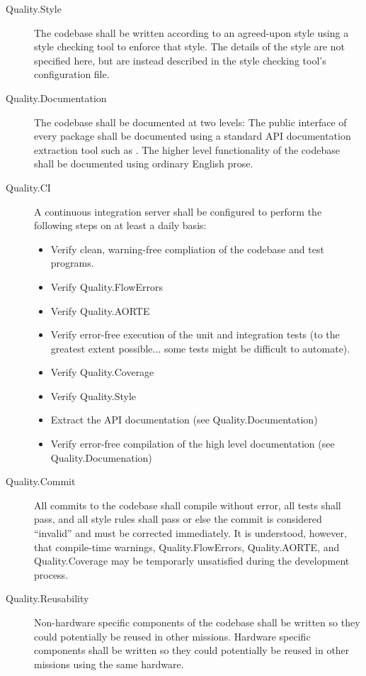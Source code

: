 \begin{description}
\item[Quality.Style] The codebase shall be written according to an
  agreed-upon style using a style checking tool to enforce that
  style. The details of the style are not specified here, but are
  instead described in the style checking tool's configuration file.

\item[Quality.Documentation] The codebase shall be documented at two
  levels: The public interface of every package shall be documented
  using a standard API documentation extraction tool such as
  . The higher level functionality of the codebase
  shall be documented using ordinary English prose.
  
\item[Quality.CI] A continuous integration server shall be configured
  to perform the following steps on at least a daily basis:
  \begin{itemize}
  \item Verify clean, warning-free compliation of the codebase and
    test programs.
  \item Verify Quality.FlowErrors
  \item Verify Quality.AORTE
  \item Verify error-free execution of the unit and integration tests
    (to the greatest extent possible... some tests might be difficult
    to automate).
  \item Verify Quality.Coverage
  \item Verify Quality.Style
  \item Extract the API documentation (see Quality.Documentation)
  \item Verify error-free compilation of the high level documentation
    (see Quality.Documenation)
  \end{itemize}

\item[Quality.Commit] All commits to the codebase shall compile
  without error, all tests shall pass, and all style rules shall pass
  or else the commit is considered ``invalid'' and must be corrected
  immediately. It is understood, however, that compile-time warnings,
  Quality.FlowErrors, Quality.AORTE, and Quality.Coverage may be
  temporarly unsatisfied during the development process.

\item[Quality.Reusability] Non-hardware specific components of the
  codebase shall be written so they could potentially be reused in
  other missions. Hardware specific components shall be written so
  they could potentially be reused in other missions using the same
  hardware.

\end{description}

